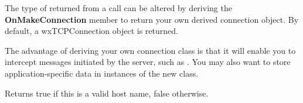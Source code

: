 \label{wxtcpclientonmakeconnection}


The type of  returned from a  call can
be altered by deriving the {\bf OnMakeConnection} member to return your
own derived connection object. By default, a wxTCPConnection
object is returned.

The advantage of deriving your own connection class is that it will
enable you to intercept messages initiated by the server, such
as . You may also want to
store application-specific data in instances of the new class.

\label{wxtcpclientvalidhost}


Returns true if this is a valid host name, false otherwise.

